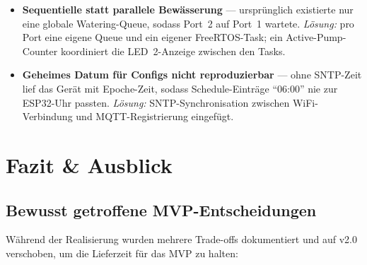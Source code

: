 \documentclass[a4paper,12pt]{article}
\begin{document}
\begin{itemize}
        Provisionierungs-Eingaben enthielten teils Whitespace
        (Copy/Paste), was \texttt{mqtt:// 10.0.0.80:1883}
        produzierte. \emph{Lösung:} JavaScript trimmt jeden
        Eingabewert vor dem POST.
  \item \textbf{Sequentielle statt parallele Bewässerung} ---
        ursprünglich existierte nur eine globale Watering-Queue, sodass
        Port~2 auf Port~1 wartete. \emph{Lösung:} pro Port eine
        eigene Queue und ein eigener FreeRTOS-Task; ein
        Active-Pump-Counter koordiniert die LED~2-Anzeige
        zwischen den Tasks.
  \item \textbf{Geheimes Datum für Configs nicht reproduzierbar} ---
        ohne SNTP-Zeit lief das Gerät mit Epoche-Zeit, sodass
        Schedule-Einträge ``06:00'' nie zur ESP32-Uhr passten.
        \emph{Lösung:} SNTP-Synchronisation zwischen
        WiFi-Verbindung und MQTT-Registrierung eingefügt.
\end{itemize}

\section{Fazit \& Ausblick}

\subsection{Bewusst getroffene MVP-Entscheidungen}

Während der Realisierung wurden mehrere Trade-offs dokumentiert und
auf v2.0 verschoben, um die Lieferzeit für das MVP zu halten:
\end{document}
